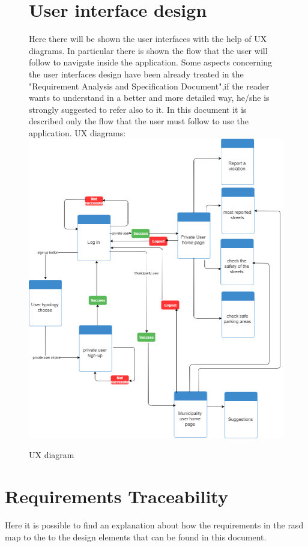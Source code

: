 \documentclass[titlepage]{article}
\begin{document}
\begin{figure}[h]
	\section{User interface design}
Here there will be shown the user interfaces with the help of UX diagrams. In particular there is shown the flow that the user will follow to navigate inside the application. Some aspects concerning the user interfaces design have been already treated in the "Requirement Analysis and Specification Document",if the reader wants to understand in a better and more detailed way, he/she is strongly suggested to refer also to it. In this document it is described only the flow that the user must follow to use the application.
UX diagrams:\\
	\includegraphics[scale=0.48]{Diagrams/UX diagram.png}
	\caption{UX diagram}
\end{figure}
\FloatBarrier
\section{ Requirements Traceability}
Here it is possible to find an explanation about how the requirements in the rasd map to the to the design elements that can be found in this document.
\end{document}
